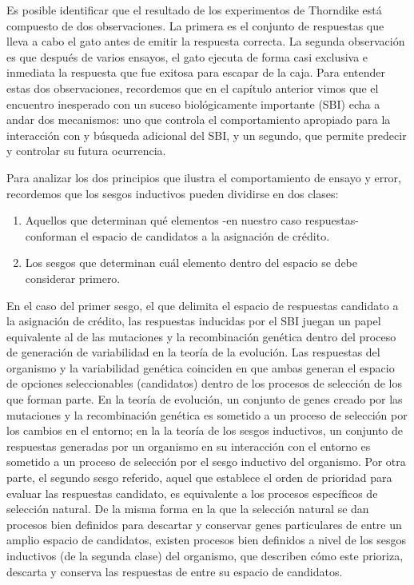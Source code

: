 \documentclass[
  letterpaper,
]{book}
\begin{document}
Es posible identificar que el resultado de los experimentos de Thorndike
está compuesto de dos observaciones. La primera es el conjunto de
respuestas que lleva a cabo el gato antes de emitir la respuesta
correcta. La segunda observación es que después de varios ensayos, el
gato ejecuta de forma casi exclusiva e inmediata la respuesta que fue
exitosa para escapar de la caja. Para entender estas dos observaciones,
recordemos que en el capítulo anterior vimos que el encuentro inesperado
con un suceso biológicamente importante (SBI) echa a andar dos
mecanismos: uno que controla el comportamiento apropiado para la
interacción con y búsqueda adicional del SBI, y un segundo, que permite
predecir y controlar su futura ocurrencia.

Para analizar los dos principios que ilustra el comportamiento de ensayo
y error, recordemos que los sesgos inductivos pueden dividirse en dos
clases:

\begin{enumerate}
\def\labelenumi{\arabic{enumi}.}
\item
  Aquellos que determinan qué elementos -en nuestro caso respuestas-
  conforman el espacio de candidatos a la asignación de crédito.
\item
  Los sesgos que determinan cuál elemento dentro del espacio se debe
  considerar primero.
\end{enumerate}

En el caso del primer sesgo, el que delimita el espacio de respuestas
candidato a la asignación de crédito, las respuestas inducidas por el
SBI juegan un papel equivalente al de las mutaciones y la recombinación
genética dentro del proceso de generación de variabilidad en la teoría
de la evolución. Las respuestas del organismo y la variabilidad genética
coinciden en que ambas generan el espacio de opciones seleccionables
(candidatos) dentro de los procesos de selección de los que forman
parte. En la teoría de evolución, un conjunto de genes creado por las
mutaciones y la recombinación genética es sometido a un proceso de
selección por los cambios en el entorno; en la la teoría de los sesgos
inductivos, un conjunto de respuestas generadas por un organismo en su
interacción con el entorno es sometido a un proceso de selección por el
sesgo inductivo del organismo. Por otra parte, el segundo sesgo
referido, aquel que establece el orden de prioridad para evaluar las
respuestas candidato, es equivalente a los procesos específicos de
selección natural. De la misma forma en la que la selección natural se
dan procesos bien definidos para descartar y conservar genes
particulares de entre un amplio espacio de candidatos, existen procesos
bien definidos a nivel de los sesgos inductivos (de la segunda clase)
del organismo, que describen cómo este prioriza, descarta y conserva las
respuestas de entre su espacio de candidatos.
\end{document}

